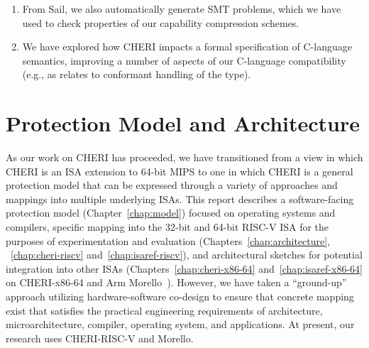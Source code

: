 \begin{enumerate}

\item From Sail, we also automatically generate SMT problems, which we
  have used to check properties of our capability compression
  schemes.


\item We have explored how CHERI impacts a formal specification of C-language
  semantics, improving a number of aspects of our C-language compatibility
  (e.g., as relates to conformant handling of the  type).
\end{enumerate}


\section{Protection Model and Architecture}

As our work on CHERI has proceeded, we have transitioned from a view in which
CHERI is an ISA extension to 64-bit MIPS to one in which CHERI is a general
protection model that can be expressed through a variety of approaches
and mappings into multiple underlying ISAs.
This report describes a software-facing protection model
(Chapter~\ref{chap:model}) focused on operating systems and compilers,
specific mapping into the 32-bit and 64-bit RISC-V ISA for the purposes of experimentation
and evaluation (Chapters~\ref{chap:architecture}, ~\ref{chap:cheri-riscv}
and~\ref{chap:isaref-riscv}), and architectural sketches for potential integration
into other ISAs (Chapters~\ref{chap:cheri-x86-64} and~\ref{chap:isaref-x86-64} on CHERI-x86-64 and Arm
Morello~\cite{arm-morello}).
However, we have taken a ``ground-up'' approach utilizing hardware-software
co-design to ensure that concrete mapping exist that
satisfies the practical engineering requirements of architecture,
microarchitecture, compiler, operating system, and applications.
At present, our research uses CHERI-RISC-V and Morello.

